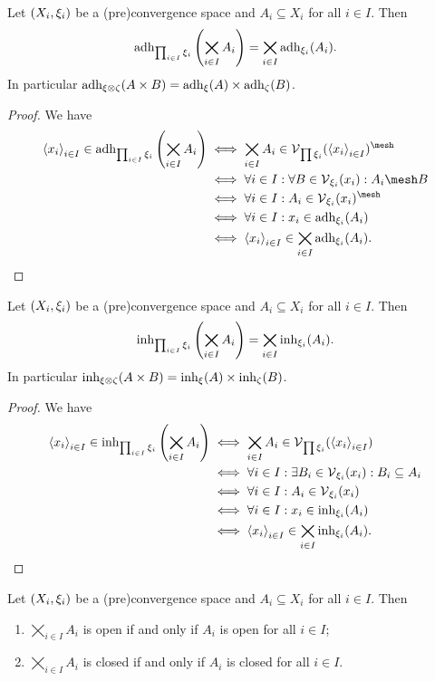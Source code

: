 \begin{corollary} \label{productAdherence}
Let $\sSet{X_i, \xi_i}$ be a (pre)convergence space and $A_i\subseteq X_i$ for all $i\in I$. Then
\[ \operatorname{adh}_{\prod_{i\in I}\xi_i}\left(\bigtimes_{i\in I}A_i\right) = \bigtimes_{i\in I}\operatorname{adh}_{\xi_i}(A_i). \]
In particular $\operatorname{adh}_{\xi\otimes \zeta}(A\times B) = \operatorname{adh}_\xi(A) \times \operatorname{adh}_\zeta(B)$.
\end{corollary}
\begin{proof}
We have
\begin{align*}
\seq{x_i}_{i\in I} \in \adh_{\prod_{i\in I}\xi_i}\left(\bigtimes_{i\in I}A_i\right) &\iff \bigtimes_{i\in I}A_i \in \vicinities_{\prod \xi_i}(\seq{x_i}_{i\in I})^{\mesh} \\
&\iff \forall i\in I: \forall B \in \vicinities_{\xi_i}(x_i): A_i\mesh B \\
&\iff \forall i\in I: A_i \in \vicinities_{\xi_i}(x_i)^{\mesh} \\
&\iff \forall i\in I: x_i \in \adh_{\xi_i}(A_i) \\
&\iff \seq{x_i}_{i\in I} \in \bigtimes_{i\in I}\adh_{\xi_i}(A_i).
\end{align*}
\end{proof}
\begin{corollary} \label{productInherence}
Let $\sSet{X_i, \xi_i}$ be a (pre)convergence space and $A_i\subseteq X_i$ for all $i\in I$. Then
\[ \operatorname{inh}_{\prod_{i\in I}\xi_i}\left(\bigtimes_{i\in I}A_i\right) = \bigtimes_{i\in I}\operatorname{inh}_{\xi_i}(A_i). \]
In particular $\operatorname{inh}_{\xi\otimes \zeta}(A\times B) = \operatorname{inh}_\xi(A) \times \operatorname{inh}_\zeta(B)$.
\end{corollary}
\begin{proof}
We have
\begin{align*}
\left\langle x_i \right\rangle_{i\in I} \in \operatorname{inh}_{\prod_{i\in I}\xi_i}\left(\bigtimes_{i\in I}A_i\right) &\iff \bigtimes_{i\in I}A_i \in \operatorname{\mathcal{V}}_{\prod \xi_i}(\left\langle x_i \right\rangle_{i\in I}) \\
&\iff \forall i\in I: \exists B_i \in \operatorname{\mathcal{V}}_{\xi_i}(x_i): B_i\subseteq A_i \\
&\iff \forall i\in I: A_i \in \operatorname{\mathcal{V}}_{\xi_i}(x_i) \\
&\iff \forall i\in I: x_i \in \operatorname{inh}_{\xi_i}(A_i) \\
&\iff \left\langle x_i \right\rangle_{i\in I} \in \bigtimes_{i\in I}\operatorname{inh}_{\xi_i}(A_i).
\end{align*}
\end{proof}
\begin{corollary} \label{productOpenClosed}
Let $\sSet{X_i, \xi_i}$ be a (pre)convergence space and $A_i\subseteq X_i$ for all $i\in I$. Then
\begin{enumerate}
\item $\bigtimes_{i\in I}A_i$ is open \textup{if and only if} $A_i$ is open for all $i\in I$;
\item $\bigtimes_{i\in I}A_i$ is closed \textup{if and only if} $A_i$ is closed for all $i\in I$.
\end{enumerate}
\end{corollary}
